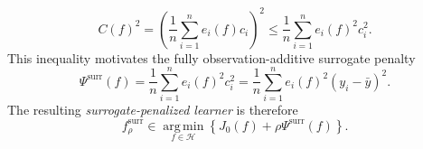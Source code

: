 \documentclass[10pt]{article}
\theoremstyle{definition}
\newcommand{\1}{\mathbf{1}}
\newcommand{\Hcal}{\mathcal{H}}
\newcommand{\argminop}{\operatorname*{arg\,min}}
\begin{document}
{
\begin{equation}
\label{eq:surrogate_upper_bound}
C(f)^2
=
\left(
\frac{1}{n}\sum_{i=1}^n e_i(f)c_i
\right)^2
\leq
\frac{1}{n}\sum_{i=1}^n e_i(f)^2c_i^2.
\end{equation}
}
{This inequality motivates the fully observation-additive surrogate penalty}
\begin{equation}
\label{eq:surrogate}
\Psi^{\mathrm{surr}}(f)
=
\frac{1}{n}\sum_{i=1}^n e_i(f)^2c_i^2
=
\frac{1}{n}\sum_{i=1}^n
e_i(f)^2(y_i-\bar y)^2.
\end{equation}
The resulting \emph{surrogate-penalized learner} is therefore
\begin{equation}
\label{eq:surrogate_learning}
f_\rho^{\mathrm{surr}}
\in
\argminop_{f\in\Hcal}
\left\{
{J_0(f)}
+
\rho\Psi^{\mathrm{surr}}(f)
\right\}.
\end{equation}
\end{document}
